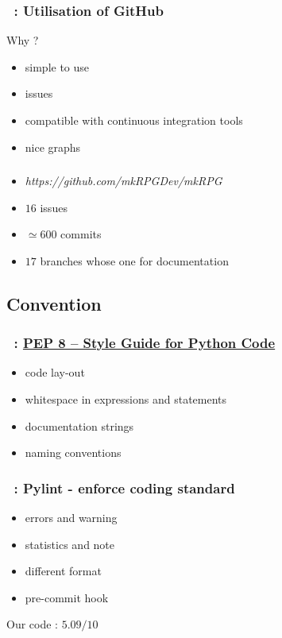 \documentclass[11pt]{beamer}
\begin{document}
\begin{frame}
    \frametitle{\secname~: Utilisation of GitHub}
    Why ?
    \begin{itemize}
        \item simple to use
        \item issues
        \item compatible with continuous integration tools 
        \item nice graphs 
    \end{itemize}
\end{frame}

\begin{frame}
    \frametitle{\secname}
    \begin{itemize}
    	\item \textit{https://github.com/mkRPGDev/mkRPG}
        \item $16$ issues
        \item $\simeq 600$ commits
        \item $17$ branches whose one for documentation
    \end{itemize}
\end{frame}

\subsection{Convention}
\begin{frame}
    \frametitle{\secname~: \href{https://www.python.org/dev/peps/pep-0008/}{PEP 8 -- Style Guide for Python Code}}
    \begin{itemize}
        \item code lay-out
        \item whitespace in expressions and statements
        \item documentation strings
        \item naming conventions
    \end{itemize}
\end{frame}

\begin{frame}
    \frametitle{\secname~: Pylint - enforce coding standard}
    \begin{itemize}
        \item errors and warning
        \item statistics and note 
        \item different format
        \item pre-commit hook 
    \end{itemize}  
    Our code : $5.09/10$
\end{frame}
\end{document}

